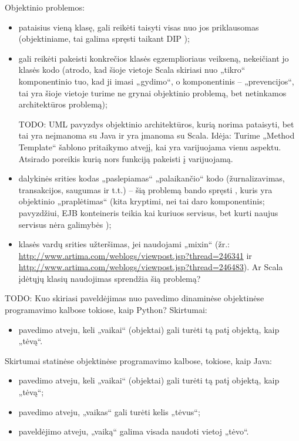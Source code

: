 Objektinio problemos:
\begin{itemize}
  \item pataisius vieną klasę, gali reikėti taisyti visas nuo jos
    priklausomas (objektiniame, tai galima spręsti taikant DIP
    );
  \item gali reikėti pakeisti konkrečios klasės egzemplioriaus veikseną,
    nekeičiant jo klasės kodo (atrodo, kad šioje vietoje Scala skiriasi
    nuo „tikro“ komponentinio tuo, kad ji imasi „gydimo“, o komponentinis
    – „prevencijos“, tai yra šioje vietoje turime ne grynai objektinio
    problemą, bet netinkamos architektūros problemą);

    TODO: UML pavyzdys objektinio architektūros, kurią norima
    pataisyti, bet tai yra neįmanoma su Java ir yra įmanoma su Scala.
    Idėja: Turime „Method Template“ šablono pritaikymo atvejį,
    kai yra varijuojama vienu aspektu. Atsirado poreikis kurią nors
    funkciją pakeisti į varijuojamą.

  \item dalykinės srities kodas „paslepiamas“ „palaikančio“ kodo
    (žurnalizavimas, transakcijos, saugumas ir t.t.) – šią problemą
    bando spręsti , kuris yra objektinio
    „praplėtimas“ (kita kryptimi, nei tai daro komponentinis; pavyzdžiui,
    EJB konteineris teikia kai kuriuos servisus, bet kurti naujus
    servisus nėra galimybės \cite[285]{mastering-EJB});
  \item klasės vardų srities užteršimas, jei naudojami „mixin“
    (žr.: \url{http://www.artima.com/weblogs/viewpost.jsp?thread=246341}
    ir \url{http://www.artima.com/weblogs/viewpost.jsp?thread=246483}).
    Ar Scala įdėtųjų  klasių naudojimas sprendžia šią problemą?
\end{itemize}

TODO: Kuo skiriasi paveldėjimas nuo pavedimo dinaminėse objektinėse
programavimo kalbose tokiose, kaip Python? Skirtumai:
\begin{itemize}
  \item pavedimo atveju, keli „vaikai“ (objektai) gali turėti tą
    patį objektą, kaip „tėvą“.
\end{itemize}
Skirtumai statinėse objektinėse programavimo kalbose, tokiose, kaip
Java:
\begin{itemize}
  \item pavedimo atveju, keli „vaikai“ (objektai) gali turėti tą
    patį objektą, kaip „tėvą“;
  \item pavedimo atveju, „vaikas“ gali turėti kelis „tėvus“;
  \item paveldėjimo atveju, „vaiką“ galima visada naudoti vietoj „tėvo“.
\end{itemize}

